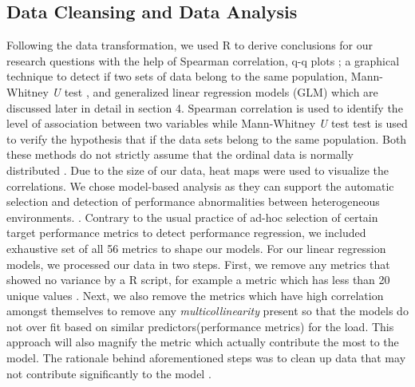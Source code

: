 \subsection{Data Cleansing and Data Analysis}
Following the data transformation, we used R \cite{R} to derive conclusions for our research questions with the help of Spearman correlation, q-q plots \cite{qqplots}; a graphical technique to detect if two sets of data belong to the same population, Mann-Whitney \textit{U} test \cite{mannwhitney}, and generalized linear regression models (GLM) \cite{SanFranciscoStateUniversity} which are discussed later in detail in section 4. Spearman correlation is used to identify the level of association between two variables while Mann-Whitney \textit{U} test  test is used to verify the hypothesis that if the data sets belong to the same population.
Both these methods do not strictly assume that the ordinal data is normally distributed \cite{spearman} \cite{manutest}. Due to the size of our data, heat maps \cite{heatmaps} were used to visualize the correlations. We chose model-based analysis as they can support the automatic selection and detection of performance abnormalities between heterogeneous environments. \cite{Shang:2015:ADP:2668930.2688052}\cite{Nguyen:2012:ADP:2188286.2188344}. Contrary to the usual practice of ad-hoc selection of certain target performance metrics \cite{heger2013automated} to detect performance regression, we included exhaustive set of all 56 metrics to shape our models. For our linear regression models, we processed our data in two steps. First, we remove any metrics that showed no variance by a R script, for example a metric which has less than 20 unique values \cite{rahm2000data}. Next, we also remove the metrics which have high correlation amongst themselves to remove any \textit{multicollinearity} present \cite{mansfield1982detecting} so that the models do not over fit based on similar predictors(performance metrics) for the load. This approach will also magnify the metric which actually contribute the most to the model. The rationale behind aforementioned steps was to clean up data that may not contribute significantly to the model \cite{Shihab:2010:UIC:1852786.1852792}. 


